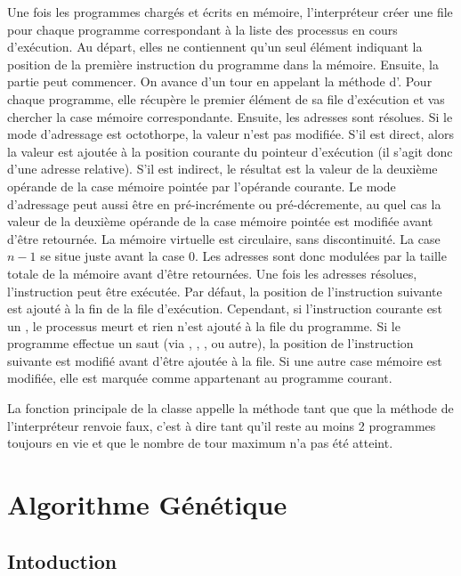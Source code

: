 \documentclass[a4paper,12pt]{article} %
\begin{document}
Une fois les programmes chargés et écrits en mémoire, l'interpréteur créer une file pour chaque programme correspondant à la liste des processus en cours d'exécution. Au départ, elles ne contiennent qu'un seul élément indiquant la position de la première instruction du programme dans la mémoire. Ensuite, la partie peut commencer. On avance d'un tour en appelant la méthode  d'. Pour chaque programme, elle récupère le premier élément de sa file d'exécution et vas chercher la case mémoire correspondante. Ensuite, les adresses sont résolues. Si le mode d'adressage est octothorpe, la valeur n'est pas modifiée. S'il est direct, alors la valeur est ajoutée à la position courante du pointeur d'exécution (il s'agit donc d'une adresse relative). S'il est indirect, le résultat est la valeur de la deuxième opérande de la case mémoire pointée par l'opérande courante. Le mode d'adressage peut aussi être en pré-incrémente ou pré-décremente, au quel cas la valeur de la deuxième opérande de la case mémoire pointée est modifiée avant d'être retournée. La mémoire virtuelle est circulaire, sans discontinuité. La case $n-1$ se situe juste avant la case $0$. Les adresses sont donc modulées par la taille totale de la mémoire avant d'être retournées. Une fois les adresses résolues, l'instruction peut être exécutée. Par défaut, la position de l'instruction suivante est ajouté à la fin de la file d'exécution. Cependant, si l'instruction courante est un , le processus meurt et rien n'est ajouté à la file du programme. Si le programme effectue un saut (via , , , ou autre), la position de l'instruction suivante est modifié avant d'être ajoutée à la file. Si une autre case mémoire est modifiée, elle est marquée comme appartenant au programme courant.

La fonction principale de la classe  appelle la méthode  tant que que la méthode  de l'interpréteur renvoie faux, c'est à dire tant qu'il reste au moins 2 programmes toujours en vie et que le nombre de tour maximum n'a pas été atteint.
\section{Algorithme Génétique} %
\subsection{Intoduction}
\end{document}

